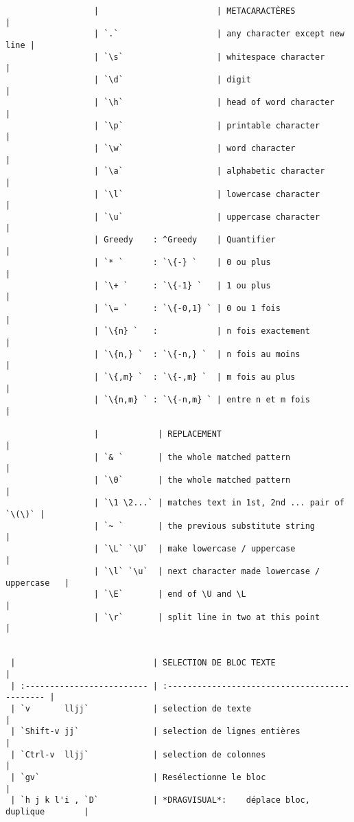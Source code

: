 \documentclass[10pt,landscape]{article}
\begin{document}
\begin{multicols}{2}
\begin{verbatim}
                  |                        | METACARACTÈRES                |
                  | `.`                    | any character except new line |
                  | `\s`                   | whitespace character          |
                  | `\d`                   | digit                         |
                  | `\h`                   | head of word character        |
                  | `\p`                   | printable character           |
                  | `\w`                   | word character                |
                  | `\a`                   | alphabetic character          |
                  | `\l`                   | lowercase character           |
                  | `\u`                   | uppercase character           |
                  | Greedy    : ^Greedy    | Quantifier                    |
                  | `* `      : `\{-} `    | 0 ou plus                     |
                  | `\+ `     : `\{-1} `   | 1 ou plus                     |
                  | `\= `     : `\{-0,1} ` | 0 ou 1 fois                   |
                  | `\{n} `   :            | n fois exactement             |
                  | `\{n,} `  : `\{-n,} `  | n fois au moins               |
                  | `\{,m} `  : `\{-,m} `  | m fois au plus                |
                  | `\{n,m} ` : `\{-n,m} ` | entre n et m fois             |

                  |            | REPLACEMENT                                 |
                  | `& `       | the whole matched pattern                   |
                  | `\0`       | the whole matched pattern                   |
                  | `\1 \2...` | matches text in 1st, 2nd ... pair of `\(\)` |
                  | `~ `       | the previous substitute string              |
                  | `\L` `\U`  | make lowercase / uppercase                  |
                  | `\l` `\u`  | next character made lowercase / uppercase   |
                  | `\E`       | end of \U and \L                            |
                  | `\r`       | split line in two at this point             |


 |                            | SELECTION DE BLOC TEXTE                        |
 | :------------------------- | :--------------------------------------------- |
 | `v       lljj`             | selection de texte                             |
 | `Shift-v jj`               | selection de lignes entières                   |
 | `Ctrl-v  lljj`             | selection de colonnes                          |
 | `gv`                       | Resélectionne le bloc                          |
 | `h j k l'i , `D`           | *DRAGVISUAL*:    déplace bloc, duplique        |


\end{verbatim}
\end{multicols}
\end{document}

